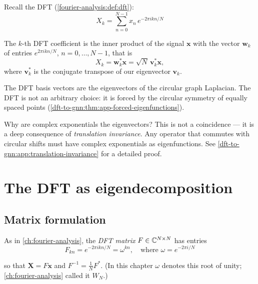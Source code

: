 \begin{notechapter}
Recall the DFT (\cref{fourier-analysis:def:dft}):
\begin{equation}
X_k = \sum_{n=0}^{N-1} x_n \, e^{-2\pi i kn/N}
\end{equation}

The $k$-th DFT coefficient is the inner product of the signal
$\mathbf{x}$ with the vector $\mathbf w_k$ of entries $e^{2\pi i kn/N}$, $n = 0, \ldots, N-1$, that is
\[
X_k = \mathbf w_k^*\mathbf x = \sqrt N\,\mathbf{v}_k^*\mathbf{x},
\]
where $\mathbf{v}_k^*$ is the conjugate transpose of our eigenvector $\mathbf{v}_k$.

\begin{keyidea}
The DFT basis vectors are the eigenvectors of
the circular graph Laplacian. The DFT is not an arbitrary choice: it
is forced by the circular symmetry of equally spaced points (\cref{dft-to-gnn:thm:app-forced-eigenfunctions}).
\end{keyidea}

\begin{remark}
Why are complex exponentials the eigenvectors? This is not a
coincidence --- it is a deep consequence of \emph{translation
invariance}. Any operator that commutes with circular shifts must
have complex exponentials as eigenfunctions. See
\cref{dft-to-gnn:app:translation-invariance} for a detailed proof.
\end{remark}

\section{The DFT as eigendecomposition}

\subsection{Matrix formulation}

As in \cref{ch:fourier-analysis}, the \emph{DFT matrix} $F \in \mathbb{C}^{N \times N}$ has entries
\begin{equation}
F_{kn} = e^{-2\pi i kn/N} = \omega^{kn},
\quad \text{where } \omega = e^{-2\pi i/N}
\end{equation}

so that $\mathbf{X} = F\mathbf{x}$ and $F^{-1} = \frac1N F^*$. (In this chapter $\omega$ denotes this root of unity; \cref{ch:fourier-analysis} called it $W_N$.)


\end{notechapter}
